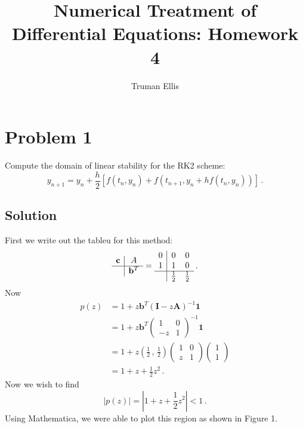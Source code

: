 \documentclass[10pt,letterpaper]{article}
\title{Numerical Treatment of Differential Equations: Homework 4}
\author{Truman Ellis}
\def\mbf{\mathbf}
\providecommand{\abs}[1]{\left\lvert#1\right\rvert}
\begin{document}
\maketitle

\section*{Problem 1}
Compute the domain of linear stability for the RK2 scheme:
\[
y_{n+1}=y_n+\frac{h}{2}\left[ f(t_n,y_n)+f(t_{n+1},y_n+hf(t_n,y_n))\right]\,.
\]

\subsection*{Solution}
First we write out the tableu for this method:
\[
\begin{array}{c|c}
    \mbf{c} & A\\
    \hline
    & \mbf{b}^T
\end{array}=
\begin{array}{c|cc}
    0 & 0 & 0\\
    1 & 1 & 0\\
    \hline
    &\frac{1}{2}&\frac{1}{2}
\end{array}\,.
\]
Now 
\begin{align*}
p(z)&=1+z\mbf{b}^T(\mbf{I}-z\mbf{A})^{-1}\mbf{1}\\
&=1+z\mbf{b}^T\left(
\begin{array}{cc}
    1 & 0\\
    -z & 1
\end{array}\right)^{-1}\mbf{1}\\
&=1+z\left(\frac{1}{2}\,,\,\frac{1}{2}\right)\left(
\begin{array}{cc}
    1 & 0\\
    z & 1
\end{array}\right)\left(
\begin{array}{c}
    1\\
    1
\end{array}\right)\\
&=1+z+\frac{1}{2}z^2\,.
\end{align*}
Now we wish to find 
\[
\abs{p(z)}=\abs{1+z+\frac{1}{2}z^2}<1\,.
\]
Using Mathematica, we were able to plot this region as shown in Figure 1.
\end{document}
